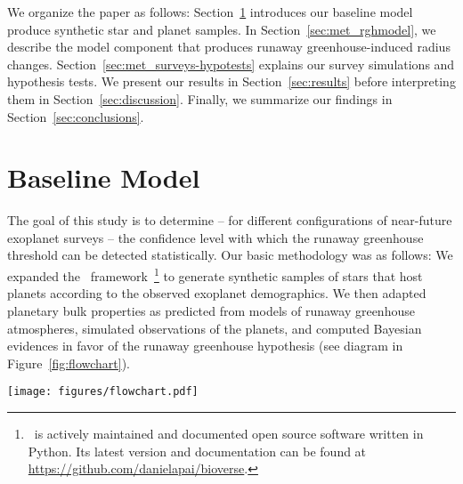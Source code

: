 \documentclass[twocolumn,twocolappendix]{aastex631}
\begin{document}
We organize the paper as follows:
Section~\ref{sec:met_baseline} introduces our baseline model produce synthetic star and planet samples.
In Section~\ref{sec:met_rghmodel}, we describe the model component that produces runaway greenhouse-induced radius changes.
Section~\ref{sec:met_surveys-hypotests} explains our survey simulations and hypothesis tests.
We present our results in Section~\ref{sec:results} before interpreting them in Section~\ref{sec:discussion}.
Finally, we summarize our findings in Section~\ref{sec:conclusions}.


\section{Baseline Model}\label{sec:met_baseline}
The goal of this study is to determine -- for different configurations of near-future exoplanet surveys -- the confidence level with which the runaway greenhouse threshold can be detected statistically. %
Our basic methodology was as follows:
We expanded the \bioverse\ framework~\citep{Bixel2020,Bixel2021}\footnote{\bioverse\ is actively maintained and documented open source software written in Python. Its latest version and documentation can be found at \url{https://github.com/danielapai/bioverse}.} to generate synthetic samples of stars that host planets according to the observed exoplanet demographics.
We then adapted planetary bulk properties as predicted from models of runaway greenhouse atmospheres, simulated observations of the planets, and computed Bayesian evidences in favor of the runaway greenhouse hypothesis (see diagram in Figure~\ref{fig:flowchart}).
\begin{figure*}
    \begin{centering}
        \texttt{[image: figures/flowchart.pdf]}
        \caption{Workflow of our hypothesis testing with \bioverse. First, we generate a sample of stars and populate them with planets based on \kepler\ demographics.
            A fraction of them are then assigned a runaway greenhouse climate based on the model described in Sect.~\ref{sec:met_rghmodel}.
        We then simulate an exoplanet survey, whereby selection effects and detection biases are introduced. Finally, we test the runaway greenhouse hypothesis based on data from the survey simulation.
        By iterating through these steps, we compute the statistical power of testing the hypothesis for different survey designs.}
        \label{fig:flowchart}
    \end{centering}
\end{figure*}
\end{document}
